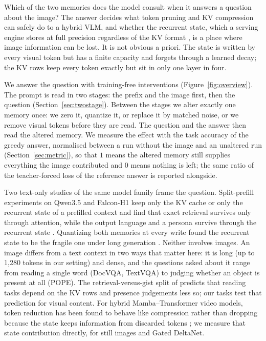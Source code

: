 \documentclass[10pt,twocolumn]{article}
\begin{document}
Which of the two memories does the model consult when it answers a question about the image? The answer decides
what token pruning and KV compression can safely do to a hybrid VLM, and whether the recurrent state, which a
serving engine stores at full precision regardless of the KV format \citep{vllm2026fp8kv}, is a place where image
information can be lost. It is not obvious a priori. The state is written by every visual token but has a finite
capacity and forgets through a learned decay; the KV rows keep every token exactly but sit in only one layer in
four.

We answer the question with training-free interventions (Figure~\ref{fig:overview}). The prompt is read in two stages: the prefix and the
image first, then the question (Section~\ref{sec:twostage}). Between the stages we alter exactly one memory once:
we zero it, quantize it, or replace it by matched noise, or we remove visual tokens before they are read. The
question and the answer then read the altered memory. We measure the effect with the task accuracy of the greedy
answer, normalised between a run without the image and an unaltered run (Section~\ref{sec:metric}), so that $1$
means the altered memory still supplies everything the image contributed and $0$ means nothing is left; the same
ratio of the teacher-forced loss of the reference answer is reported alongside.

Two text-only studies of the same model family frame the question. Split-prefill experiments on Qwen3.5 and
Falcon-H1 keep only the KV cache or only the recurrent state of a prefilled context and find that exact retrieval
survives only through attention, while the output language and a persona survive through the recurrent state
\citep{afendulev2026recalls}. Quantizing both memories at every write found the recurrent state to be the fragile
one under long generation \citep{shin2026hybridquant}. Neither involves images. An image differs from a text
context in two ways that matter here: it is long (up to 1,280 tokens in our setting) and dense, and the questions
asked about it range from reading a single word (DocVQA, TextVQA) to judging whether an object is present at all
(POPE). The retrieval-versus-gist split of \citep{afendulev2026recalls} predicts that reading tasks depend on the
KV rows and presence judgements less so; our tasks test that prediction for visual content. For hybrid
Mamba--Transformer video models, token reduction has been found to behave like compression rather than dropping
because the state keeps information from discarded tokens \citep{jiang2026stateful}; we measure that state
contribution directly, for still images and Gated DeltaNet.
\end{document}
